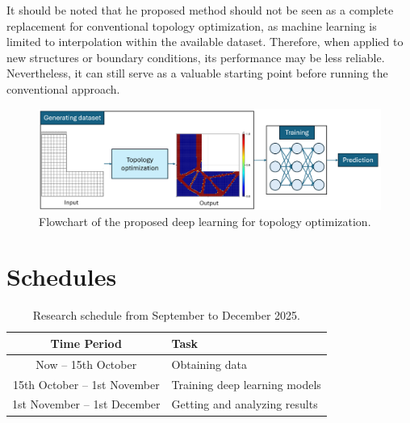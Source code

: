 \documentclass{article} %
\begin{document}
It should be noted that he proposed method should not be seen as a complete replacement for conventional topology optimization, as machine learning is limited to interpolation within the available dataset. Therefore, when applied to new structures or boundary conditions, its performance may be less reliable. Nevertheless, it can still serve as a valuable starting point before running the conventional approach.

\begin{figure}[htp!]
	\centering
	\includegraphics[scale=0.45]{DL_TOP.png}
	\caption{Flowchart of the proposed deep learning for topology optimization.}
	\label{Fig_DL_TOP}
\end{figure}

\section{Schedules}

\begin{table}[h!]
	\centering
	\caption{Research schedule from September to December 2025.}
	\label{tab:schedule}
	\begin{tabular}{|c|l|}
		\hline
		\textbf{Time Period} & \textbf{Task} \\ \hline
		Now -- 15th October   & Obtaining data \\ \hline
		15th October -- 1st November & Training deep learning models \\ \hline
		1st November -- 1st December & Getting and analyzing results \\ \hline
	\end{tabular}
\end{table}
\end{document}
